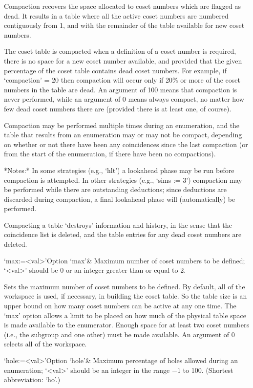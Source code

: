 Compaction recovers the space allocated to  coset  numbers  which  are
flagged as dead. It results in a table  where  all  the  active  coset
numbers are numbered contiguously from 1, and with  the  remainder  of
the table available for new coset numbers.

The coset table is compacted when a definition of a  coset  number  is
required, there is no space for a  new  coset  number  available,  and
provided that the given percentage of the coset  table  contains  dead
coset numbers. For example, if `compaction'  =  $20$  then  compaction
will occur only if 20\% or more of the coset numbers in the table  are
dead. An argument of 100 means that  compaction  is  never  performed,
while an argument of 0 means always compact, no matter  how  few  dead
coset numbers there are (provided there is at least one, of course).

Compaction may be performed  multiple times during an enumeration, and
the table that results from an  enumeration may or may not be compact,
depending on whether or not there have been any coincidences since the
last compaction (or  from the start of the  enumeration, if there have
been no compactions).

*Notes:*
In some strategies (e.g., `hlt') a lookahead phase may be  run  before
compaction is attempted. In  other  strategies  (e.g.,  `sims  :=  3')
compaction may be performed while there  are  outstanding  deductions;
since deductions are discarded during compaction,  a  final  lookahead
phase will (automatically) be performed.

Compacting a table \lq{}destroys'  information  and  history,  in  the
sense that the coincidence list is deleted, and the table entries  for
any dead coset numbers are deleted.

\>`max:=<val>'{Option `max'}&
Maximum number of coset numbers to be defined;
`<val>' should be $0$ or an integer greater than or equal to 2.

Sets the maximum  number of coset numbers to  be defined.  By default,
all  of the workspace  is used,  if necessary,  in building  the coset
table.  So the table size is  an upper bound on how many coset numbers
can be active at any one time.   The `max' option allows a limit to be
placed on  how much of the  physical table space is  made available to
the enumerator.   Enough space for  at least two coset  numbers (i.e.,
the subgroup and one other) must  be made available.  An argument of 0
selects all of the workspace.

\>`hole:=<val>'{Option `hole'}&
Maximum percentage of holes allowed during an enumeration;
`<val>' should be an integer in the range $-1$ to 100.
(Shortest abbreviation: `ho'.)

